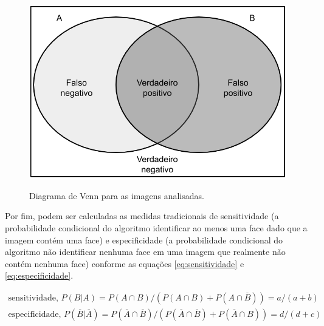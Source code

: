  \begin{figure}[htbp]
     \centering
     \caption{Diagrama de Venn para as imagens analisadas.}
     \includegraphics[scale=.4]{figs/venn-diagram.png}
     \label{fig:venn_diagram}
  \end{figure}

Por fim, podem ser calculadas as medidas tradicionais de sensitividade (a probabilidade condicional do algoritmo identificar ao menos uma face dado que a imagem contém uma face) e especificidade (a probabilidade condicional do algoritmo não identificar nenhuma face em uma imagem que realmente não contém nenhuma face) conforme as equações \ref{eq:sensitividade} e \ref{eq:especificidade}.

\begin{align} \label{eq:sensitividade}
    \text{sensitividade, } P(B|A) = P(A \cap B) / (P(A \cap B) + P(A \cap \overline{B})) = a/(a + b) \\
    \label{eq:especificidade}
    \text{especificidade, } P(\overline{B} | \overline{A}) = P(\overline{A} \cap \overline{B}) / (P(\overline{A} \cap \overline{B}) + P(\overline{A} \cap B)) = d/(d + c)
\end{align}
